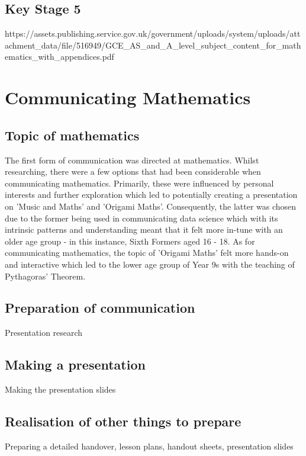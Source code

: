 \documentclass[12pt, a4paper,oneside]{book}
\numberwithin{equation}{section}
\begin{document}
\section{Key Stage 5}
https://assets.publishing.service.gov.uk/government/uploads/system/uploads/attachment_data/file/516949/GCE_AS_and_A_level_subject_content_for_mathematics_with_appendices.pdf

\chapter{Communicating Mathematics}\label{ch:x.x}

\section{Topic of mathematics}\label{sec:x.x}
The first form of communication was directed at mathematics. Whilst researching, there were a few options that had been considerable when communicating mathematics. Primarily, these were influenced by personal interests and further exploration which led to potentially creating a presentation on 'Music and Maths' and 'Origami Maths'. Consequently, the latter was chosen due to the former being used in communicating data science which with its intrinsic patterns and understanding meant that it felt more in-tune with an older age group - in this instance, Sixth Formers aged 16 - 18. As for communicating mathematics, the topic of 'Origami Maths' felt more hands-on and interactive which led to the lower age group of Year 9s with the teaching of Pythagoras' Theorem.

\section{Preparation of communication}\label{sec:x.x}

Presentation research

\section{Making a presentation}\label{sec:x.x}

Making the presentation slides

\section{Realisation of other things to prepare}\label{sec:x.x}

Preparing a detailed handover, lesson plans, handout sheets, presentation slides
\end{document}

